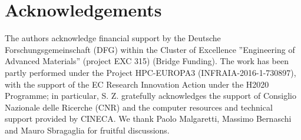 \section{Acknowledgements}\label{sec:ack_two}
The authors acknowledge financial support by the Deutsche Forschungsgemeinschaft (DFG) within the Cluster of Excellence ''Engineering of Advanced Materials'' (project EXC 315) (Bridge Funding). 
The work has been partly performed under the Project HPC-EUROPA3 (INFRAIA-2016-1-730897), with the support of the EC Research Innovation Action under the H2020 Programme; in particular, S. Z. gratefully acknowledges the support of Consiglio Nazionale delle Ricerche (CNR) and the computer resources and technical support provided by CINECA.
We thank Paolo Malgaretti, Massimo Bernaschi and Mauro Sbragaglia for fruitful discussions.